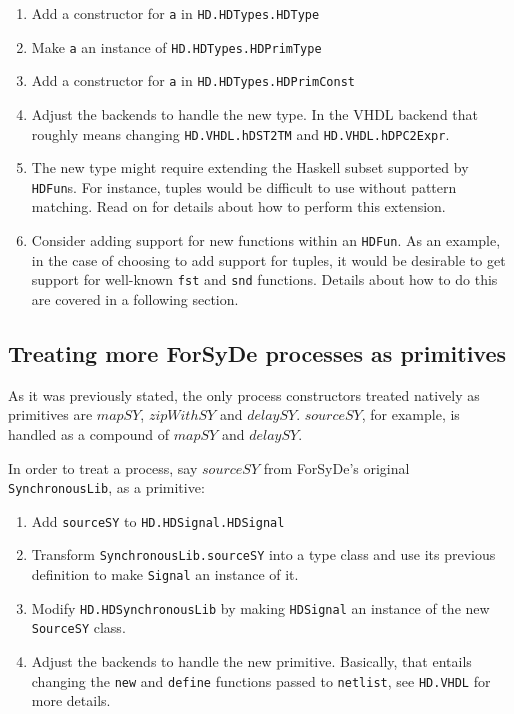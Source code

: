\begin{enumerate}[1)]
\item Add a constructor for \texttt{a} in \texttt{HD.HDTypes.HDType}
\item Make \texttt{a} an instance of \texttt{HD.HDTypes.HDPrimType}
\item Add a constructor for \texttt{a} in \texttt{HD.HDTypes.HDPrimConst}
\item Adjust the backends to handle the new type. In the VHDL backend
  that roughly means changing \texttt{HD.VHDL.hDST2TM} and
  \texttt{HD.VHDL.hDPC2Expr}.
\item The new type might require extending the Haskell subset
  supported by \texttt{HDFun}s. For instance, tuples would be difficult to
  use without pattern matching. Read on for details about how to perform
  this extension.
\item Consider adding support for new functions within an
  \texttt{HDFun}.  As an example, in the case of choosing to add
  support for tuples, it would be desirable to get support for
  well-known \texttt{fst} and \texttt{snd} functions.  Details about
  how to do this are covered in a following section.
\end{enumerate}

\subsection{Treating more ForSyDe processes as primitives}

As it was previously stated, the only process constructors treated
natively as primitives are $\mathit{mapSY}$, $\mathit{zipWithSY}$ and
$\mathit{delaySY}$.  $\mathit{sourceSY}$, for example, is handled as a
compound of $\mathit{mapSY}$ and $\mathit{delaySY}$.

In order to treat a process, say $\mathit{sourceSY}$ from ForSyDe's
original \texttt{SynchronousLib}, as a primitive:

\begin{enumerate}[1)]
\item Add \texttt{sourceSY} to \texttt{HD.HDSignal.HDSignal}
\item Transform \texttt{SynchronousLib.sourceSY} into a type class and use
  its previous definition to make \texttt{Signal} an instance of it.
\item Modify \texttt{HD.HDSynchronousLib} by making \texttt{HDSignal}
  an instance of the new \texttt{SourceSY} class.
\item Adjust the backends to handle the new primitive. Basically, that entails
  changing the \texttt{new} and \texttt{define} functions passed to
  \texttt{netlist}, see \texttt{HD.VHDL} for more details.
\end{enumerate}

